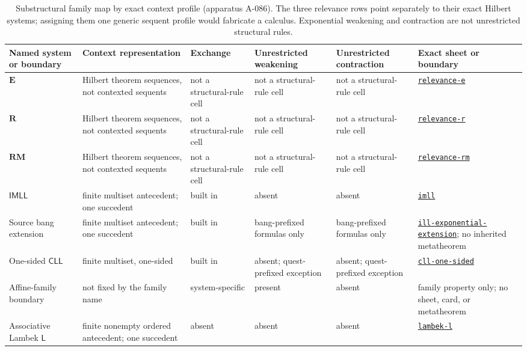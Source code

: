 \begin{table}[!htbp]
\centering
\begingroup\scriptsize
\setlength{\tabcolsep}{3pt}
\begin{tabular}{@{}p{}p{}p{}
  p{}p{}p{}@{}}
\toprule
Named system or boundary & Context representation & Exchange & Unrestricted
weakening & Unrestricted contraction & Exact sheet or boundary \\
\midrule
\(\mathbf E\) & Hilbert theorem sequences, not contexted sequents & not a
structural-rule cell & not a structural-rule cell & not a structural-rule cell
& \hyperref[sheet:relevance-e]{\texttt{relevance-e}} \\
\(\mathbf R\) & Hilbert theorem sequences, not contexted sequents & not a
structural-rule cell & not a structural-rule cell & not a structural-rule cell
& \hyperref[sheet:relevance-r]{\texttt{relevance-r}} \\
\(\mathbf{RM}\) & Hilbert theorem sequences, not contexted sequents & not a
structural-rule cell & not a structural-rule cell & not a structural-rule cell
& \hyperref[sheet:relevance-rm]{\texttt{relevance-rm}} \\
\(\mathsf{IMLL}\) & finite multiset antecedent; one succedent & built in &
absent & absent & \hyperref[sheet:imll]{\texttt{imll}} \\
Source bang extension & finite multiset antecedent; one succedent & built in &
bang-prefixed formulas only & bang-prefixed formulas only &
\hyperref[sheet:ill-exponential-extension]{\texttt{ill-exponential-extension}};
no inherited metatheorem \\
One-sided \(\mathsf{CLL}\) & finite multiset, one-sided & built in &
absent; quest-prefixed exception & absent; quest-prefixed exception &
\hyperref[sheet:cll-one-sided]{\texttt{cll-one-sided}} \\
Affine-family boundary & not fixed by the family name & system-specific &
present & absent & family property only; no sheet, card, or metatheorem \\
Associative Lambek \(\mathsf L\) & finite nonempty ordered antecedent; one
succedent & absent & absent & absent &
\hyperref[sheet:lambek-l]{\texttt{lambek-l}} \\
\bottomrule
\end{tabular}
\endgroup
\caption{Substructural family map by exact context profile (apparatus A-086).
The three relevance rows point separately to their exact Hilbert systems;
assigning them one generic sequent profile would fabricate a calculus.
Exponential weakening and contraction are not unrestricted structural rules.}
\label{tab:p08-substructural-family}
\end{table}

